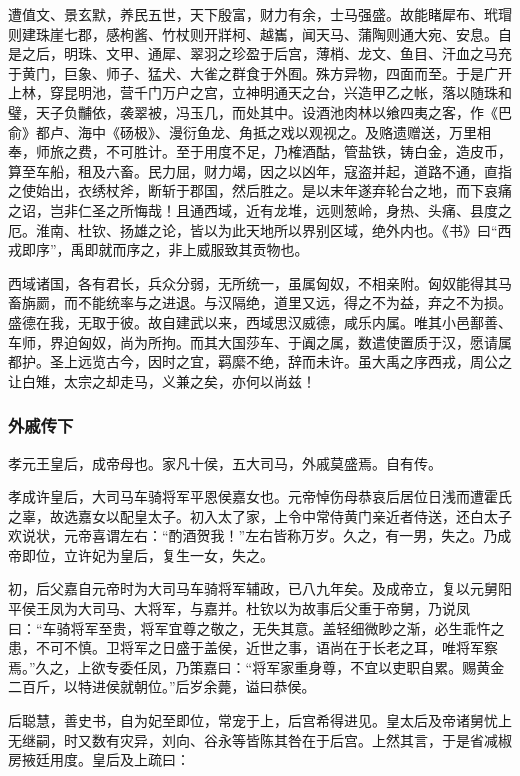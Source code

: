 \documentclass[]{article}
\begin{document}
遭值文、景玄默，养民五世，天下殷富，财力有余，士马强盛。故能睹犀布、玳瑁则建珠崖七郡，感枸酱、竹杖则开牂柯、越巂，闻天马、蒲陶则通大宛、安息。自是之后，明珠、文甲、通犀、翠羽之珍盈于后宫，薄梢、龙文、鱼目、汗血之马充于黄门，巨象、师子、猛犬、大雀之群食于外囿。殊方异物，四面而至。于是广开上林，穿昆明池，营千门万户之宫，立神明通天之台，兴造甲乙之帐，落以随珠和璧，天子负黼依，袭翠被，冯玉几，而处其中。设酒池肉林以飨四夷之客，作《巴俞》都卢、海中《砀极》、漫衍鱼龙、角抵之戏以观视之。及赂遗赠送，万里相奉，师旅之费，不可胜计。至于用度不足，乃榷酒酤，管盐铁，铸白金，造皮币，算至车船，租及六畜。民力屈，财力竭，因之以凶年，寇盗并起，道路不通，直指之使始出，衣绣杖斧，断斩于郡国，然后胜之。是以末年遂弃轮台之地，而下哀痛之诏，岂非仁圣之所悔哉！且通西域，近有龙堆，远则葱岭，身热、头痛、县度之厄。淮南、杜钦、扬雄之论，皆以为此天地所以界别区域，绝外内也。《书》曰``西戎即序''，禹即就而序之，非上威服致其贡物也。

西域诸国，各有君长，兵众分弱，无所统一，虽属匈奴，不相亲附。匈奴能得其马畜旃罽，而不能统率与之进退。与汉隔绝，道里又远，得之不为益，弃之不为损。盛德在我，无取于彼。故自建武以来，西域思汉威德，咸乐内属。唯其小邑鄯善、车师，界迫匈奴，尚为所拘。而其大国莎车、于阗之属，数遣使置质于汉，愿请属都护。圣上远览古今，因时之宜，羁縻不绝，辞而未许。虽大禹之序西戎，周公之让白雉，太宗之却走马，义兼之矣，亦何以尚兹！

\hypertarget{header-n6620}{%
\subsubsection{外戚传下}\label{header-n6620}}

孝元王皇后，成帝母也。家凡十侯，五大司马，外戚莫盛焉。自有传。

孝成许皇后，大司马车骑将军平恩侯嘉女也。元帝悼伤母恭哀后居位日浅而遭霍氏之辜，故选嘉女以配皇太子。初入太了家，上令中常侍黄门亲近者侍送，还白太子欢说状，元帝喜谓左右：``酌酒贺我！''左右皆称万岁。久之，有一男，失之。乃成帝即位，立许妃为皇后，复生一女，失之。

初，后父嘉自元帝时为大司马车骑将军辅政，已八九年矣。及成帝立，复以元舅阳平侯王凤为大司马、大将军，与嘉并。杜钦以为故事后父重于帝舅，乃说凤曰：``车骑将军至贵，将军宜尊之敬之，无失其意。盖轻细微眇之渐，必生乖忤之患，不可不慎。卫将军之日盛于盖侯，近世之事，语尚在于长老之耳，唯将军察焉。''久之，上欲专委任凤，乃策嘉曰：``将军家重身尊，不宜以吏职自累。赐黄金二百斤，以特进侯就朝位。''后岁余薨，谥曰恭侯。

后聪慧，善史书，自为妃至即位，常宠于上，后宫希得进见。皇太后及帝诸舅忧上无继嗣，时又数有灾异，刘向、谷永等皆陈其咎在于后宫。上然其言，于是省减椒房掖廷用度。皇后及上疏曰：
\end{document}
